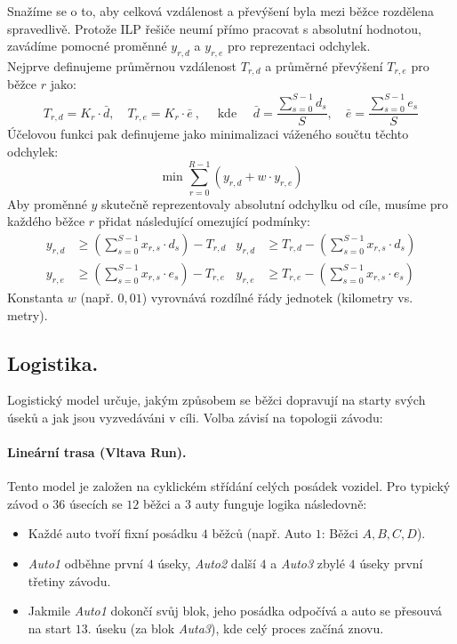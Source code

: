 \documentclass[10pt, a4paper]{article}
\begin{document}
	Snažíme se o to, aby celková vzdálenost a převýšení byla mezi běžce rozdělena spravedlivě. Protože ILP řešiče neumí přímo pracovat s absolutní hodnotou, zavádíme pomocné proměnné $y_{r,d}$ a $y_{r,e}$ pro reprezentaci odchylek.\\
	Nejprve definujeme průměrnou vzdálenost $T_{r,d}$ a průměrné převýšení $T_{r,e}$ pro běžce $r$ jako:\[
		T_{r,d} = K_r \cdot \bar{d}, \quad T_{r,e} = K_r \cdot \bar{e}~, \quad\text{ kde }\quad
		\bar{d} = \frac{\sum_{s=0}^{S-1} d_s}{S}, \quad  \bar{e} = \frac{\sum_{s=0}^{S-1} e_s}{S}
	\]
	Účelovou funkci pak definujeme jako minimalizaci váženého součtu těchto odchylek:\[
		\min \sum_{r=0}^{R-1} (y_{r,d} + w \cdot y_{r,e})
	\]
	Aby proměnné $y$ skutečně reprezentovaly absolutní odchylku od cíle, musíme pro každého běžce $r$ přidat následující omezující podmínky:
	\begin{align*}
		y_{r,d} &\ge \left( \sum_{s=0}^{S-1} x_{r,s} \cdot d_s \right) - T_{r,d} & y_{r,d} &\ge T_{r,d} - \left( \sum_{s=0}^{S-1} x_{r,s} \cdot d_s \right) \\
		y_{r,e} &\ge \left( \sum_{s=0}^{S-1} x_{r,s} \cdot e_s \right) - T_{r,e} & y_{r,e} &\ge T_{r,e} - \left( \sum_{s=0}^{S-1} x_{r,s} \cdot e_s \right)
	\end{align*}
	Konstanta $w$ (např. $0,01$) vyrovnává rozdílné řády jednotek (kilometry vs. metry).
	
	
	\subsection*{Logistika.}
	Logistický model určuje, jakým způsobem se běžci dopravují na starty svých úseků a jak jsou vyzvedáváni v cíli. Volba závisí na topologii závodu:
	
	\paragraph*{Lineární trasa (Vltava Run).}
	Tento model je založen na cyklickém střídání celých posádek vozidel. Pro typický závod o $36$ úsecích se $12$ běžci a $3$ auty funguje logika následovně:
	\begin{itemize}
		\item Každé auto tvoří fixní posádku $4$ běžců (např. Auto $1$: Běžci $A, B, C, D$).
		\item \textit{Auto1} odběhne první $4$ úseky, \textit{Auto2} další $4$ a \textit{Auto3} zbylé $4$ úseky první třetiny závodu.
		\item Jakmile \textit{Auto1} dokončí svůj blok, jeho posádka odpočívá a auto se přesouvá na start $13.$ úseku (za blok \textit{Auta3}), kde celý proces začíná znovu.
	\end{itemize}
	
\end{document}

